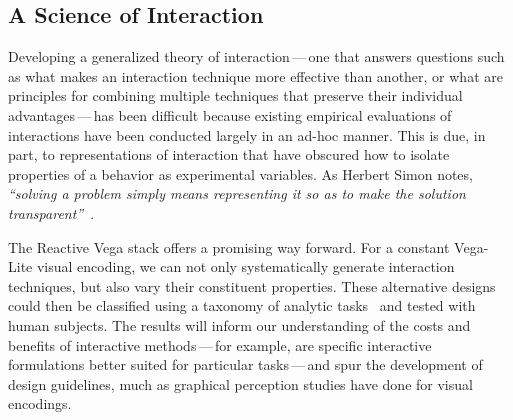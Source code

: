 \subsection{A Science of Interaction}

Developing a generalized theory of interaction\,---\,one that answers questions
such as what makes an interaction technique more effective than another, or what
are principles for combining multiple techniques that preserve their individual
advantages\,---\,has been difficult because existing empirical evaluations of
interactions have been conducted largely in an ad-hoc manner. This is due, in
part, to representations of interaction that have obscured how to isolate
properties of a behavior as experimental variables. As Herbert Simon notes,
\emph{``solving a problem simply means representing it so as to make the
solution transparent''}~\cite{simon:designscience}.

The Reactive Vega stack offers a promising way forward. For a constant Vega-Lite
visual encoding, we can not only systematically generate interaction techniques,
but also vary their constituent properties. These alternative designs could then
be classified using a taxonomy of analytic tasks~\cite{brehmer:taxonomy} and
tested with human subjects. The results will inform our understanding of the
costs and benefits of interactive methods\,---\,for example, are specific
interactive formulations better suited for particular tasks\,---\,and spur the
development of design guidelines, much as graphical perception studies have done
for visual encodings.